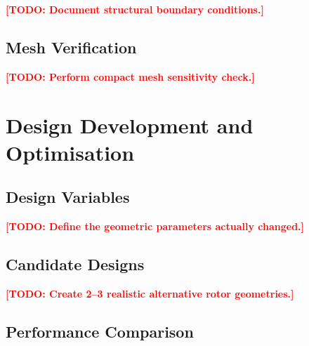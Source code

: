 \documentclass[11pt,a4paper]{article}
\newcommand{\todo}[1]{\textcolor{red}{\textbf{[TODO: #1]}}}
\begin{document}

\todo{Document structural boundary conditions.}


\subsection{Mesh Verification}

%
%
%

\todo{Perform compact mesh sensitivity check.}


\section{Design Development and Optimisation}

\subsection{Design Variables}

%
%

\todo{Define the geometric parameters actually changed.}


\subsection{Candidate Designs}

%

\todo{Create 2--3 realistic alternative rotor geometries.}


\subsection{Performance Comparison}

\end{document}
